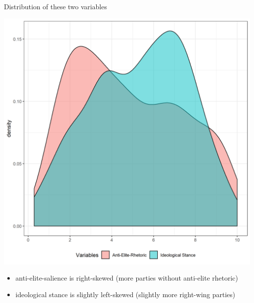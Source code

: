 \documentclass[
  ignorenonframetext,
]{beamer}
\providecommand{\tightlist}{%
  \setlength{\itemsep}{0pt}\setlength{\parskip}{0pt}}
\begin{document}
\begin{frame}{Distribution of these two variables}
\protect\hypertarget{distribution-of-these-two-variables}{}

\begin{center}\includegraphics[width=0.75\linewidth,height=0.6\textheight]{PNG/density_CHES} \end{center}

\begin{itemize}
\tightlist
\item
  anti-elite-salience is right-skewed (more parties without anti-elite
  rhetoric)
\item
  ideological stance is slightly left-skewed (slightly more right-wing
  parties)
\end{itemize}

\end{frame}
\end{document}

